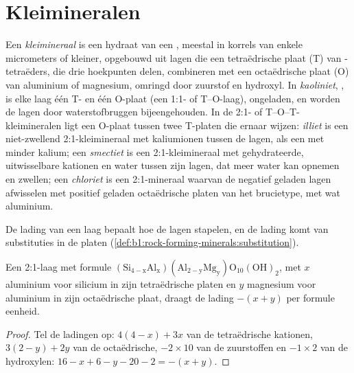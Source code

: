 \section{Kleimineralen}\label{sec:b1:weathering-clays:clays}

\begin{definition}\label{def:b1:weathering-clays:clay-mineral}
Een \emph{kleimineraal} is een hydraat van een , meestal in korrels van enkele micrometers of kleiner, opgebouwd uit lagen die een tetraëdrische plaat (T) van -tetraëders, die drie hoekpunten delen, combineren met een octaëdrische plaat (O) van aluminium of magnesium, omringd door zuurstof en hydroxyl. In \emph{kaoliniet}, , is elke laag één T- en één O-plaat (een 1:1- of T--O-laag), ongeladen, en worden de lagen door waterstofbruggen bijeengehouden. In de 2:1- of T--O--T-kleimineralen ligt een O-plaat tussen twee T-platen die ernaar wijzen: \emph{illiet} is een niet-zwellend 2:1-kleimineraal met kaliumionen tussen de lagen, als een  met minder kalium; een \emph{smectiet} is een 2:1-kleimineraal met gehydrateerde, uitwisselbare kationen en water tussen zijn lagen, dat meer water kan opnemen en zwellen; een \emph{chloriet} is een 2:1-mineraal waarvan de negatief geladen lagen afwisselen met positief geladen octaëdrische platen van het brucietype,  met wat aluminium.
\end{definition}

De lading van een laag bepaalt hoe de lagen stapelen, en de lading komt van substituties in de platen (\cref{def:b1:rock-forming-minerals:substitution}).

\begin{proposition}\label{prop:b1:weathering-clays:layer-charge}
Een 2:1-laag met formule $\mathrm{(Si_{4-x}Al_x)(Al_{2-y}Mg_y)O_{10}(OH)_2}$, met
$x$ aluminium voor silicium in zijn tetraëdrische platen en $y$ magnesium voor
aluminium in zijn octaëdrische plaat, draagt de lading $-(x + y)$ per formule
eenheid.
\end{proposition}

\begin{proof}
Tel de ladingen op: $4(4 - x) + 3x$ van de tetraëdrische kationen, $3(2 - y) + 2y$ van de octaëdrische, $-2\times10$ van de zuurstoffen en $-1\times2$ van de hydroxylen: $16 - x + 6 - y - 20 - 2 = -(x + y)$.
\end{proof}

